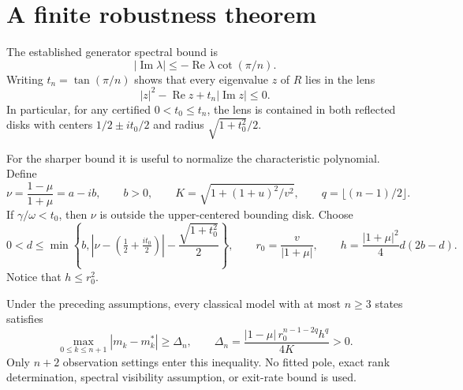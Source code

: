 \section{A finite robustness theorem}
The established generator spectral bound is
\begin{equation}
 |\operatorname{Im}\lambda|
 \leq-\operatorname{Re}\lambda\cot(\pi/n).
 \label{eq:generator-sector-rf}
\end{equation}
Writing $t_n=\tan(\pi/n)$ shows that every eigenvalue $z$ of $R$ lies in the lens
\begin{equation}
 |z|^2-\operatorname{Re}z+t_n|\operatorname{Im}z|\leq0.
 \label{eq:resolvent-lens}
\end{equation}
In particular, for any certified $0<t_0\leq t_n$, the lens is contained
in both reflected disks with centers $1/2\pm it_0/2$ and radius
$\sqrt{1+t_0^2}/2$.

For the sharper bound it is useful to normalize the characteristic polynomial.
Define
\[
 \nu=\frac{1-\mu}{1+\mu}=a-ib,\qquad b>0,\qquad
 K=\sqrt{1+(1+u)^2/v^2},\qquad q=\lfloor(n-1)/2\rfloor.
\]
If $\gamma/\omega<t_0$, then $\nu$ is outside the upper-centered bounding disk.
Choose
\[
 0<d\leq\min\left\{b,
 \left|\nu-\left(\tfrac12+\tfrac{it_0}{2}\right)\right|
 -\frac{\sqrt{1+t_0^2}}2\right\},\qquad
 r_0=\frac{v}{|1+\mu|},\qquad
 h=\frac{|1+\mu|^2}{4}d(2b-d).
\]
Notice that $h\leq r_0^2$.

\begin{theorem}
\label{thm:finite-erlang}
Under the preceding assumptions, every classical model with at most $n\geq3$
states satisfies
\begin{equation}
 \max_{0\leq k\leq n+1}|m_k-m_k^*|
 \geq\Delta_n,
 \qquad
 \Delta_n=\frac{|1-\mu|\,r_0^{n-1-2q}h^q}{4K}>0.
 \label{eq:finite-erlang-gap}
\end{equation}
Only $n+2$ observation settings enter this inequality. No fitted pole, exact
rank determination, spectral visibility assumption, or exit-rate bound is used.
\end{theorem}

